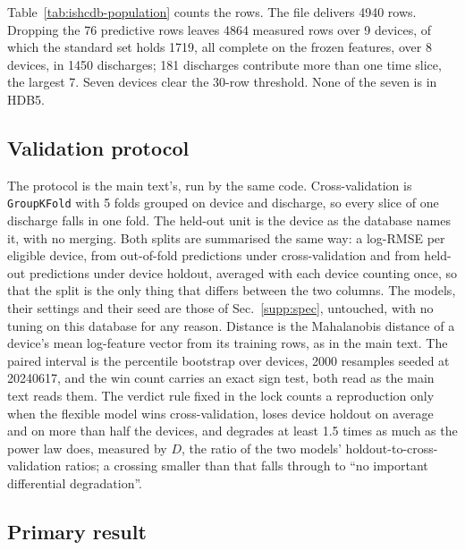 \documentclass[12pt,letterpaper]{article}
\begin{document}
Table~\ref{tab:ishcdb-population} counts the rows. The file delivers 4940 rows. Dropping the
76 predictive rows leaves 4864 measured
rows over 9 devices, of which the standard set holds
1719, all complete on the frozen features, over
8 devices, in 1450 discharges;
181 discharges contribute more than one time slice,
the largest 7. Seven devices clear the
30-row threshold. None of the seven is in HDB5.

\subsection{Validation protocol}

The protocol is the main text's, run by the same code. Cross-validation is
\texttt{GroupKFold} with 5 folds grouped on device and
discharge, so every slice of one discharge falls in one fold. The held-out unit
is the device as the database names it, with no merging. Both splits are
summarised the same way: a log-RMSE per eligible device, from out-of-fold
predictions under cross-validation and from held-out predictions under device
holdout, averaged with each device counting once, so that the split is the only
thing that differs between the two columns. The models, their settings and their
seed are those of Sec.~\ref{supp:spec}, untouched, with no tuning on this database for any
reason. Distance is the Mahalanobis distance of a device's mean log-feature
vector from its training rows, as in the main text. The paired interval is the
percentile bootstrap over devices, 2000 resamples
seeded at 20240617, and the win count carries an exact sign
test, both read as the main text reads them. The verdict rule fixed in the lock
counts a reproduction only when the flexible model wins cross-validation, loses
device holdout on average and on more than half the devices, and degrades at least
1.5 times as much as the power law does, measured
by $D$, the ratio of the two models' holdout-to-cross-validation ratios; a
crossing smaller than that falls through to ``no important differential
degradation''.

\subsection{Primary result}
\end{document}
